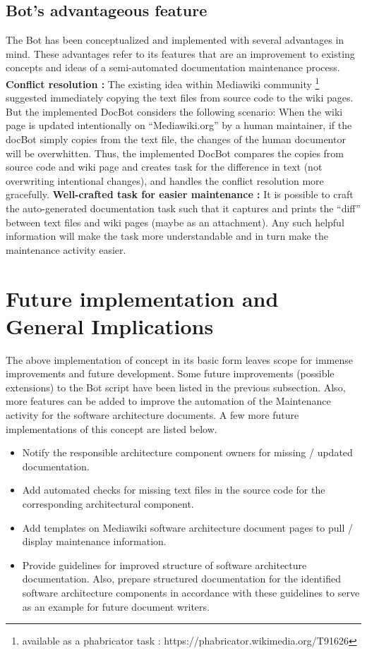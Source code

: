 \subsection{Bot's advantageous feature}
The Bot has been conceptualized and implemented with several advantages in mind. These advantages refer to its features that are an improvement to existing concepts and ideas of a semi-automated documentation maintenance process.
\newline
\textbf{Conflict resolution : } The existing idea within Mediawiki community \footnote{available as a phabricator task :  https://phabricator.wikimedia.org/T91626} suggested immediately copying the text files from source code to the wiki pages. But the implemented DocBot considers the following scenario:
\newline When the wiki page is updated intentionally on \enquote{Mediawiki.org} by a human maintainer, if the docBot simply copies from the text file, the changes of the human documentor will be overwhitten.
\newline Thus, the implemented DocBot compares the copies from source code and wiki page and creates task for the difference in text (not overwriting intentional changes), and handles the conflict resolution more gracefully.   
\newline 
\textbf{Well-crafted task for easier maintenance : } It is possible to craft the auto-generated documentation task such that it captures and prints the \enquote{diff} between text files and wiki pages (maybe as an attachment).  Any such helpful information will make the task more understandable and in turn make the maintenance activity easier.


\section{Future implementation and General Implications }
The above implementation of concept in its basic form leaves scope for immense improvements and future development. Some future improvements (possible extensions) to the Bot script have been listed in the previous subsection. Also, more features can be added to improve the automation of the Maintenance activity for the software architecture documents.
\newline A few more future implementations of this concept are listed below.
\begin{itemize}
\item Notify the responsible architecture component owners for missing / updated documentation.
\item Add automated checks for missing text files in the source code for the corresponding architectural component. 
\item Add templates on Mediawiki software architecture document pages to pull / display maintenance information.
\item Provide guidelines for improved structure of software architecture documentation.
Also, prepare structured documentation for the identified software architecture components in accordance with these guidelines to serve as an example for future document writers.
\end{itemize}

